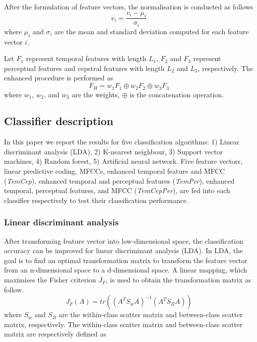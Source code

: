 After the formulation of feature vectors, the normalisation is conducted as follows
\begin{equation}
v_{i} = \frac{v_{i}-\mu_{i}}{\sigma_{i}}
\end{equation} 
where $\mu_{i}$ and $\sigma_{i}$ are the mean and standard deviation computed for each feature vector $i$.  

Let $F_{1}$ represent temporal features with length $L_{1}$, $F_{2}$ and $F_{3}$ represent perceptual features and cepstral features with length $L_{2}$ and $L_{3}$, respectively. The enhanced procedure is performed as
\begin{equation}
F_{H} = w_{1}F_{1}\oplus w_{2}F_{2} \oplus w_{3}F_{3}
\end{equation} 
where $w_{1}$, $w_{2}$, and $w_{3}$ are the weights, $\oplus$ is the concatenation operation.


\subsection{Classifier description}
In this paper we report the results for five classification algorithms: 1) Linear discriminant analysis (LDA), 2) K-nearest neighbour, 3) Support vector machines, 4) Random forest, 5) Artificial neural network. Five feature vectors, linear predictive coding, MFCCs, enhanced temporal feature and MFCC (\textit{TemCep}), enhanced temporal and perceptual features (\textit{TemPer}), enhanced temporal, perceptual features, and MFCC (\textit{TemCepPer}), are fed into each classifier respectively to test their classification performance.

\subsubsection{Linear discriminant analysis}
After transforming feature vector into low-dimensional space, the classification accuracy can be improved for linear discriminant analysis (LDA). In LDA, the goal is to find an optimal transformation matrix to transform the feature vector from an n-dimensional space to a d-dimensional space. A linear mapping, which maximises the Fisher criterion $J_{F}$, is used to obtain the transformation matrix as follow.
\begin{equation}
J_{F}(A)=tr((A^{T}S_{w}A)^{-1}(A^{T}S_{B}A))
\end{equation}
where $S_{w}$ and $S_{B}$ are the within-class scatter matrix and between-class scatter matrix, respectively. The within-class scatter matrix and between-class scatter matrix are respectively defined as 

